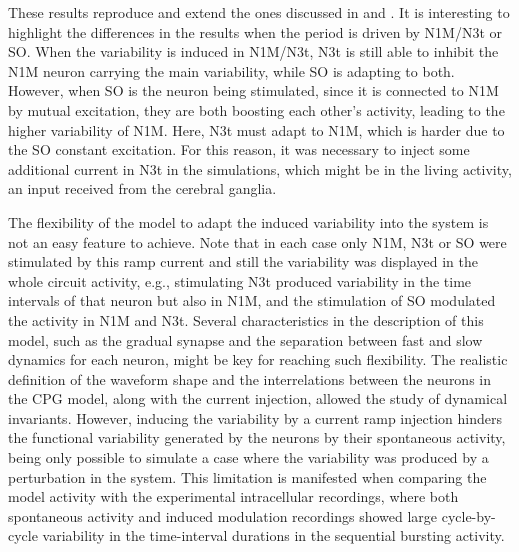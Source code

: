 These results reproduce and extend the ones discussed in \textcite{vavoulis_dynamic_2007} and \textcite{elliott_temporal_1991}. It is interesting to highlight the differences in the results when the period is driven by N1M/N3t or SO. When the variability is induced in N1M/N3t, N3t is still able to inhibit the N1M neuron carrying the main variability, while SO is adapting to both. However, when SO is the neuron being stimulated, since it is connected to N1M by mutual excitation, they are both boosting each other's activity, leading to the higher variability of N1M. Here, N3t must adapt to N1M, which is harder due to the SO constant excitation. For this reason, it was necessary to inject some additional current in N3t in the simulations, which might be in the living activity, an input received from the cerebral ganglia. 

The flexibility of the model to adapt the induced variability into the system is not an easy feature to achieve. Note that in each case only N1M, N3t or SO were stimulated by this ramp current and still the variability was displayed in the whole circuit activity, e.g., stimulating N3t produced variability in the time intervals of that neuron but also in N1M, and the stimulation of SO modulated the activity in N1M and N3t. Several characteristics in the description of this model, such as the gradual synapse and the separation between fast and slow dynamics for each neuron, might be key for reaching such flexibility. The realistic definition of the waveform shape and the interrelations between the neurons in the CPG model, along with the current injection, allowed the study of dynamical invariants. However, inducing the variability by a current ramp injection hinders the functional variability generated by the neurons by their spontaneous activity, being only possible to simulate a case where the variability was produced by a perturbation in the system. This limitation is manifested when comparing the model activity with the experimental intracellular recordings, where both spontaneous activity and induced modulation recordings showed large cycle-by-cycle variability in the time-interval durations in the sequential bursting activity. 

